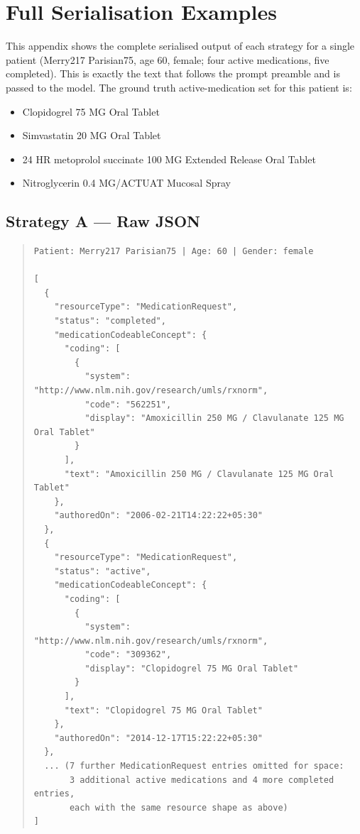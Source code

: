 \clearpage
\onecolumn
\appendix

\section{Full Serialisation Examples}
\label{app:strategy_examples}

This appendix shows the complete serialised output of each strategy for a single patient
(Merry217 Parisian75, age 60, female; four active medications, five completed). This is
exactly the text that follows the prompt preamble and is passed to the model. The ground
truth active-medication set for this patient is:

\begin{itemize}
  \item Clopidogrel 75 MG Oral Tablet
  \item Simvastatin 20 MG Oral Tablet
  \item 24 HR metoprolol succinate 100 MG Extended Release Oral Tablet
  \item Nitroglycerin 0.4 MG/ACTUAT Mucosal Spray
\end{itemize}

\subsection{Strategy A --- Raw JSON}
\label{app:strategy_a}

\begin{quote}
\scriptsize
\begin{verbatim}
Patient: Merry217 Parisian75 | Age: 60 | Gender: female

[
  {
    "resourceType": "MedicationRequest",
    "status": "completed",
    "medicationCodeableConcept": {
      "coding": [
        {
          "system": "http://www.nlm.nih.gov/research/umls/rxnorm",
          "code": "562251",
          "display": "Amoxicillin 250 MG / Clavulanate 125 MG Oral Tablet"
        }
      ],
      "text": "Amoxicillin 250 MG / Clavulanate 125 MG Oral Tablet"
    },
    "authoredOn": "2006-02-21T14:22:22+05:30"
  },
  {
    "resourceType": "MedicationRequest",
    "status": "active",
    "medicationCodeableConcept": {
      "coding": [
        {
          "system": "http://www.nlm.nih.gov/research/umls/rxnorm",
          "code": "309362",
          "display": "Clopidogrel 75 MG Oral Tablet"
        }
      ],
      "text": "Clopidogrel 75 MG Oral Tablet"
    },
    "authoredOn": "2014-12-17T15:22:22+05:30"
  },
  ... (7 further MedicationRequest entries omitted for space:
       3 additional active medications and 4 more completed entries,
       each with the same resource shape as above)
]
\end{verbatim}
\end{quote}

